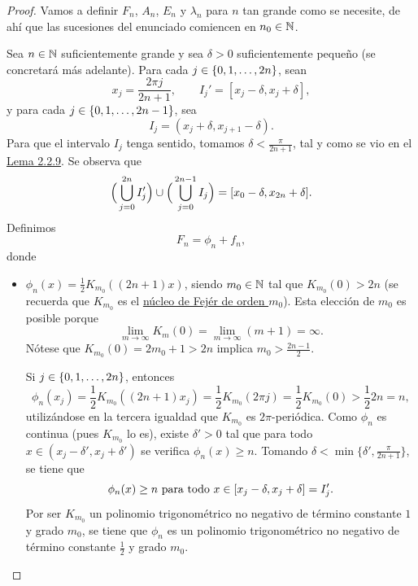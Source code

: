\documentclass[a4paper, 12pt, oneside]{book}
\begin{document}
\begin{proof}
    Vamos a definir $F_n$, $A_n$, $E_n$ y $\lambda_n$ para $n$ tan grande como se necesite, de ahí que las sucesiones del enunciado comiencen en $n_0\in\mathbb N$.
    
    Sea $n \in \mathbb N$ suficientemente grande y sea $\delta > 0$ suficientemente pequeño (se concretará más adelante). Para cada $j \in \{0,1,\mathellipsis,2n\}$, sean
    \[x_j = \frac{2\pi j}{2n+1}, \qquad I_j' = [x_j-\delta,x_j+\delta],\]
    y para cada $j \in \{0,1,\mathellipsis,2n-1\}$, sea
    \[I_j = (x_j+\delta, x_{j+1}-\delta).\]
    Para que el intervalo $I_j$ tenga sentido, tomamos $\delta < \frac{\pi}{2n+1}$, tal y como se vio en el \hyperref[2.2.9]{\color{blue}Lema 2.2.9}. Se observa que
    \[\Bigl(\,\bigcup_{j=0}^{2n}I_j'\Bigr) \cup\Bigl(\,\bigcup_{j=0}^{2n-1}I_j\Bigr) = [x_0-\delta,x_{2n}+\delta].\]
    Definimos
    \[F_n = \phi_n+f_n,\]
    donde
    \begin{itemize}
        \item $\phi_n(x) = \frac{1}{2}K_{m_0}((2n+1)x)$, siendo $m_0 \in \mathbb N$ tal que $K_{m_0}(0) > 2n$ (se recuerda que $K_{m_0}$ es el \hyperref[1.2.5]{\color{blue}núcleo de Fejér de orden $m_0$}). Esta elección de $m_0$ es posible porque \[\lim_{m \to \infty} K_m(0) = \lim_{m \to \infty} (m+1) = \infty.\]
        Nótese que $K_{m_0}(0)=2m_0+1 > 2n$ implica $m_0 > \frac{2n-1}{2}$. 
        
        Si $j \in \{0,1,\mathellipsis,2n\}$, entonces
        \[\phi_n(x_j) = \frac{1}{2}K_{m_0}((2n+1)x_j) = \frac{1}{2}K_{m_0}(2\pi j) = \frac{1}{2}K_{m_0}(0) > \frac{1}{2}2n = n,\] 
        utilizándose en la tercera igualdad que $K_{m_0}$ es $2\pi$-periódica. Como $\phi_n$ es continua (pues $K_{m_0}$ lo es), existe $\delta' > 0$ tal que para todo $x \in (x_j-\delta',x_j+\delta')$ se verifica $\phi_n(x) \geq n$. Tomando $\delta < \min\{\delta',\frac{\pi}{2n+1}\}$, se tiene que
        \begin{equation}\label{2.2.13}
            \phi_n(x) \geq n \textup{ para todo } x \in [x_j-\delta,x_j+\delta] = I_j'.
        \end{equation}
        Por ser $K_{m_0}$ un polinomio trigonométrico no negativo de término constante $1$ y grado $m_0$, se tiene que $\phi_n$ es un polinomio trigonométrico no negativo de término constante $\frac{1}{2}$ y grado $m_0$. 
        

\end{itemize}
\end{proof}
\end{document}
